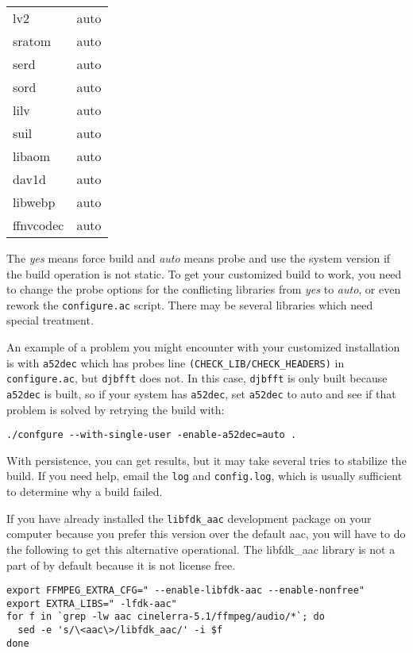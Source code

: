 \begin{table}[htpb]
\begin{tabular}{m{8em}c}
 	lv2       &auto\\
 	sratom    &auto\\
 	serd      &auto\\
 	sord      &auto\\
 	lilv      &auto\\
 	suil      &auto\\
 	libaom    &auto\\
 	dav1d     &auto\\
    libwebp   &auto\\
 	ffnvcodec &auto\\
    \bottomrule
  \end{tabular}
\end{table}


The \textit{yes} means force build and \textit{auto} means probe and
use the system version if the build operation is not static.  To get
your customized build to work, you need to change the probe options
for the conflicting libraries from \textit{yes} to \textit{auto}, or
even rework the \texttt{configure.ac} script.  There may be several
libraries which need special treatment.

An example of a problem you might encounter with your customized
installation is with \texttt{a52dec} which has probes line
\texttt{(CHECK\_LIB/CHECK\_HEADERS)} in \texttt{configure.ac}, but
\texttt{djbfft} does not.  In this case, \texttt{djbfft} is only
built because \texttt{a52dec} is built, so if your system has
\texttt{a52dec}, set \texttt{a52dec} to auto and see if that
problem is solved by retrying the build with:
\begin{lstlisting}[style=sh]
./confgure --with-single-user -enable-a52dec=auto .
\end{lstlisting}

With persistence, you can get results, but it may take several tries
to stabilize the build.  If you need help, email the \texttt{log}
and \texttt{config.log}, which is usually sufficient to determine
why a build failed.

If you have already installed the \texttt{libfdk\_aac} development
package on your computer because you prefer this version over the
default aac, you will have to do the following to get this
alternative operational. The libfdk\_aac library is not a part of
\CGG{} by default because it is not license free.

\begin{lstlisting}[style=sh]
export FFMPEG_EXTRA_CFG=" --enable-libfdk-aac --enable-nonfree"
export EXTRA_LIBS=" -lfdk-aac"
for f in `grep -lw aac cinelerra-5.1/ffmpeg/audio/*`; do
  sed -e 's/\<aac\>/libfdk_aac/' -i $f
done
\end{lstlisting}


